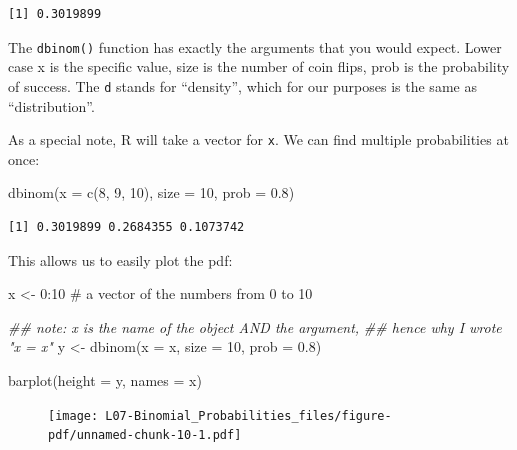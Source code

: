 \documentclass[
  letterpaper,
  DIV=11,
  numbers=noendperiod,
  oneside]{scrreprt}
\newenvironment{Shaded}{\begin{snugshade}}{\end{snugshade}}
\newcommand{\AttributeTok}[1]{\textcolor[rgb]{0.40,0.45,0.13}{#1}}
\newcommand{\CommentTok}[1]{\textcolor[rgb]{0.37,0.37,0.37}{#1}}
\newcommand{\DecValTok}[1]{\textcolor[rgb]{0.68,0.00,0.00}{#1}}
\newcommand{\DocumentationTok}[1]{\textcolor[rgb]{0.37,0.37,0.37}{\textit{#1}}}
\newcommand{\FloatTok}[1]{\textcolor[rgb]{0.68,0.00,0.00}{#1}}
\newcommand{\FunctionTok}[1]{\textcolor[rgb]{0.28,0.35,0.67}{#1}}
\newcommand{\NormalTok}[1]{\textcolor[rgb]{0.00,0.23,0.31}{#1}}
\newcommand{\OtherTok}[1]{\textcolor[rgb]{0.00,0.23,0.31}{#1}}
\newcommand{\SpecialCharTok}[1]{\textcolor[rgb]{0.37,0.37,0.37}{#1}}
\begin{document}
\begin{verbatim}
[1] 0.3019899
\end{verbatim}

The \texttt{dbinom()} function has exactly the arguments that you would
expect. Lower case x is the specific value, size is the number of coin
flips, prob is the probability of success. The \texttt{d} stands for
``density'', which for our purposes is the same as ``distribution''.

As a special note, R will take a vector for \texttt{x}. We can find
multiple probabilities at once:

\begin{Shaded}
\begin{Highlighting}[]
\FunctionTok{dbinom}\NormalTok{(}\AttributeTok{x =} \FunctionTok{c}\NormalTok{(}\DecValTok{8}\NormalTok{, }\DecValTok{9}\NormalTok{, }\DecValTok{10}\NormalTok{), }\AttributeTok{size =} \DecValTok{10}\NormalTok{, }\AttributeTok{prob =} \FloatTok{0.8}\NormalTok{)}
\end{Highlighting}
\end{Shaded}

\begin{verbatim}
[1] 0.3019899 0.2684355 0.1073742
\end{verbatim}

This allows us to easily plot the pdf:

\begin{Shaded}
\begin{Highlighting}[]
\NormalTok{x }\OtherTok{\textless{}{-}} \DecValTok{0}\SpecialCharTok{:}\DecValTok{10} \CommentTok{\# a vector of the numbers from 0 to 10}

\DocumentationTok{\#\# note: x is the name of the object AND the argument,}
\DocumentationTok{\#\# hence why I wrote "x = x"}
\NormalTok{y }\OtherTok{\textless{}{-}} \FunctionTok{dbinom}\NormalTok{(}\AttributeTok{x =}\NormalTok{ x, }\AttributeTok{size =} \DecValTok{10}\NormalTok{, }\AttributeTok{prob =} \FloatTok{0.8}\NormalTok{)}

\FunctionTok{barplot}\NormalTok{(}\AttributeTok{height =}\NormalTok{ y, }\AttributeTok{names =}\NormalTok{ x)}
\end{Highlighting}
\end{Shaded}

\begin{figure}[H]

{\centering \texttt{[image: L07-Binomial\_Probabilities\_files/figure-pdf/unnamed-chunk-10-1.pdf]}

}

\end{figure}
\end{document}
